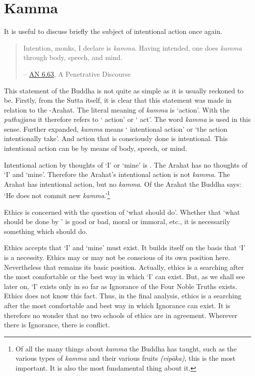 \chapter{Kamma}

It is useful to discuss briefly the subject of intentional action once again.

\begin{quote}
Intention, monks, I declare is \emph{kamma}. Having intended, one does \emph{kamma} through body, speech, and mind.

 -- \href{https://suttacentral.net/an6.63/en/thanissaro}{AN 6.63}, A Penetrative Discourse
\end{quote}

This statement of the Buddha is not quite as simple as it is usually reckoned to be. Firstly, from the Sutta itself, it is clear that this statement was made in relation to the -Arahat. The literal meaning of \emph{kamma} is `action'. With the \emph{puthujjana} it therefore refers to ` action' or ` act'. The word \emph{kamma} is used in this sense. Further expanded, \emph{kamma} means ` intentional action' or `the action  intentionally take'. And  action that is consciously done is intentional. This intentional action can be by means of body, speech, or mind.

Intentional action  by thoughts of `I' or `mine' is . The Arahat has no thoughts of `I' and `mine'. Therefore the Arahat's intentional action is not \emph{kamma}. The Arahat has intentional action, but no \emph{kamma}.  Of the Arahat the Buddha says: `He does not commit new \emph{kamma}.'\footnote{Of all the many things about \emph{kamma} the Buddha has taught, such as the various types of \emph{kamma} and their various fruits \emph{(vipāka)}, this is the most important. It is also the most fundamental thing about it.}

Ethics is concerned with the question of `what should  do'. Whether that `what should be done by ' is good or bad, moral or immoral, etc., it is necessarily something which  should do.

Ethics accepts that `I' and `mine' must exist. It builds itself on the basis that `I' is a necessity. Ethics may or may not be conscious of its own position here. Nevertheless that remains its basic position. Actually, ethics is a searching after the most comfortable or the best way in which `I' can exist. But, as we shall see later on, `I' exists only in so far as Ignorance of the Four Noble Truths exists. Ethics does not know this fact. Thus, in the final analysis, ethics is a searching after the most comfortable and best way in which Ignorance can exist. It is therefore no wonder that no two schools of ethics are in agreement. Wherever there is Ignorance, there is conflict.

